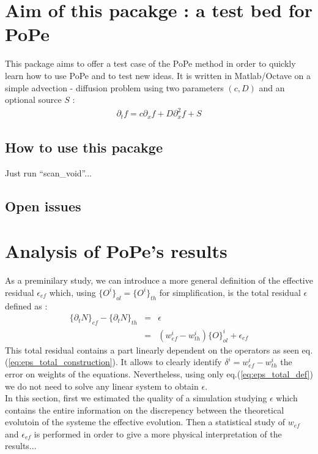 \documentclass[12pt,a4paper]{paper}
\newcommand{\acc}[2]{ \{ #1 \}_{#2} }
\begin{document}
\section{Aim of this pacakge : a test bed for PoPe}
%
This package aims to offer a test case of the PoPe method in order to quickly learn how to use PoPe and to test new ideas. It is written in Matlab/Octave on a simple advection - diffusion problem using two parameters $(c,D)$ and an optional source $S$ :
\begin{eqnarray}
  \partial_t f = c \partial_x f + D \partial_x^2 f + S
\end{eqnarray}

\subsection{How to use this pacakge}

Just run ``scan\_void''...

\subsection{Open issues}

%
\section{Analysis of PoPe's results}
As a preminilary study, we can introduce a more general definition of the effective residual $\epsilon_{ef}$ which, using $\acc{O^i}{ol}=\acc{O^i}{th}$ for simplification, is the total residual $\epsilon$ defined as :
%
\begin{eqnarray}
  \acc{\partial_t N}{ef} - \acc{\partial_t N}{th} &=& \epsilon \label{eq:eps_total_def}\\
  &=& ( w^i_{ef} - w^i_{th} ) \acc{O}{ol}^i + \epsilon_{ef} \label{eq:eps_total_construction}
\end{eqnarray}
%
This total residual contains a part linearly dependent on the operators as seen eq.(\ref{eq:eps_total_construction}). It allows to clearly identify $\delta^i=w^i_{ef} - w^i_{th}$ the error on weights of the equations. Nevertheless, using only eq.(\ref{eq:eps_total_def}) we do not need to solve any linear system to obtain $\epsilon$.\\

In this section, first we estimated the quality of a simulation studying $\epsilon$ which contains the entire information on the discrepency between the theoretical evolutoin of the systeme the effective evolution. Then a statistical study of $w_{ef}$ and $\epsilon_{ef}$ is performed in order to give a more physical interpretation of the results...

\begin{thebibliography}{100}

\end{thebibliography}
\end{document}
